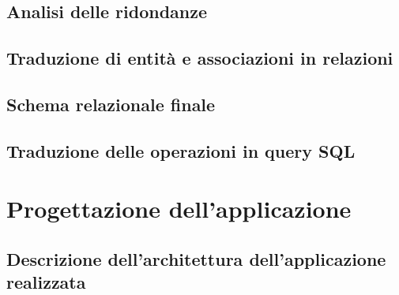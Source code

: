 \documentclass[a4paper, 12pt]{report}
\begin{document}
\section{Analisi delle ridondanze}

\section{Traduzione di entità e associazioni in relazioni}

\section{Schema relazionale finale}

\section{Traduzione delle operazioni in query SQL}

\chapter{Progettazione dell’applicazione}

\section{Descrizione dell’architettura dell’applicazione realizzata}
\end{document}
